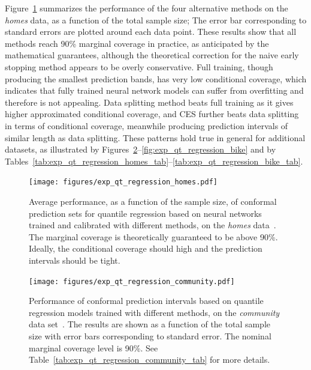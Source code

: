 Figure~\ref{fig:exp_qt_regression_homes} summarizes the performance of the four alternative methods on the {\em homes} data, as a function of the total sample size; The error bar corresponding to standard errors are plotted around each data point. These results show that all methods reach 90\% marginal coverage in practice, as anticipated by the mathematical guarantees, although the theoretical correction for the naive early stopping method appears to be overly conservative. Full training, though producing the smallest prediction bands, has very low conditional coverage, which indicates that fully trained neural network models can suffer from overfitting and therefore is not appealing. Data splitting method beats full training as it gives higher approximated conditional coverage, and CES further beats data splitting in terms of conditional coverage, meanwhile producing prediction intervals of similar length as data splitting. These patterns hold true in general for additional datasets, as illustrated by Figures~\ref{fig:exp_qt_regression_community}--\ref{fig:exp_qt_regression_bike} and by Tables~\ref{tab:exp_qt_regression_homes_tab}--\ref{tab:exp_qt_regression_bike_tab}.


\begin{figure}[!htb]
    \centering
    \texttt{[image: figures/exp\_qt\_regression\_homes.pdf]}\vspace{-0.5cm}
    \caption{Average performance, as a function of the sample size, of conformal prediction sets for quantile regression based on neural networks trained and calibrated with different methods, on the {\em homes} data~\cite{homes}. The marginal coverage is theoretically guaranteed to be above 90\%. Ideally, the conditional coverage should high and the prediction intervals should be tight.}
    \label{fig:exp_qt_regression_homes}
\end{figure}


\begin{figure}[!htb]
    \centering
    \texttt{[image: figures/exp\_qt\_regression\_community.pdf]}
    \caption{Performance of conformal prediction intervals based on quantile regression models trained with different methods, on the {\em community} data set~\cite{community}. The results are shown as a function of the total sample size with error bars corresponding to standard error. The nominal marginal coverage level is 90\%. See Table~\ref{tab:exp_qt_regression_community_tab} for more details.}
    \label{fig:exp_qt_regression_community}
\end{figure}

